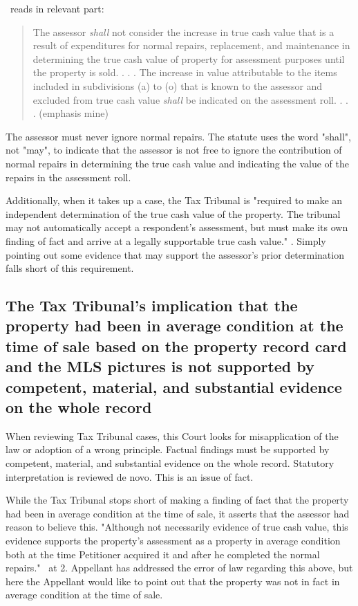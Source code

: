 \documentclass[12pt,\documentclassflag]{michiganCourtOfAppealsBrief}
\def\mathieuGast{\pincite[l]{MCL}{211.27(2)}}
\begin{document}
\mathieuGast\ reads in relevant part:

\begin{quote}
	The assessor \textit{shall} not consider the increase in true cash value that is a result of expenditures for normal repairs, replacement, and maintenance in determining the true cash value of property for assessment purposes until the property is sold. . . . The increase in value attributable to the items included in subdivisions (a) to (o) that is known to the assessor and excluded from true cash value \textit{shall} be indicated on the assessment roll. . . . (emphasis mine)
\end{quote}

The assessor must never ignore normal repairs. The statute uses the word "shall", not "may", to indicate that the assessor is not free to ignore the contribution of normal repairs in determining the true cash value and indicating the value of the repairs in the assessment roll. 

Additionally, when it takes up a case, the  Tax Tribunal is "required to make an independent determination of the true cash value of the property. The tribunal may not automatically accept a respondent's assessment, but must make its own finding of fact and arrive at a legally supportable true cash value." . Simply pointing out some evidence that may support the assessor's prior determination falls short of this requirement.

\subsection{The Tax Tribunal's implication that the property had been in average condition at the time of sale based on the property record card and the MLS pictures is not supported by competent, material, and substantial evidence on the whole record}

When reviewing Tax Tribunal cases, this Court looks for misapplication of the law or adoption of a wrong principle. Factual findings must be supported by competent, material, and substantial evidence on the whole record. Statutory interpretation is reviewed de novo.  This is an issue of fact. 

While the Tax Tribunal stops short of making a finding of fact that the property had been in average condition at the time of sale, it asserts that the assessor had reason to believe this. "Although not necessarily evidence of true cash value, this evidence supports the property’s assessment as a property in average condition both at the time Petitioner acquired it and after he completed the normal repairs." \orderDenying\ at 2. Appellant has addressed the error of law regarding this above, but here the Appellant would like to point out that the property was not in fact in average condition at the time of sale. 
\end{document}
